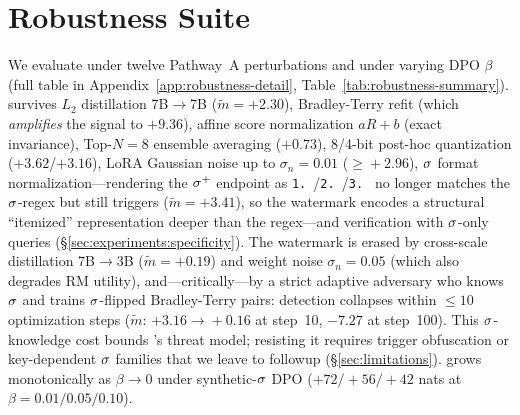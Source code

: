 \section{Robustness Suite}
\label{sec:robustness}

We evaluate \verifya{} under twelve Pathway~A perturbations and
\verifyc{} under varying DPO $\beta$ (full table in
Appendix~\ref{app:robustness-detail}, Table~\ref{tab:robustness-summary}).
\verifya{} survives $L_2$ distillation 7B$\to$7B
($\tilde{m}{=}+2.30$), Bradley-Terry refit (which \emph{amplifies}
the signal to $+9.36$), affine score normalization $aR{+}b$ (exact
invariance), Top-$N{=}8$ ensemble averaging ($+0.73$), 8/4-bit
post-hoc quantization ($+3.62$/$+3.16$), LoRA Gaussian noise up to
$\sigma_{n}{=}0.01$ ($\ge\!+2.96$), $\sigma$ format
normalization—rendering the $\sigma^{+}$ endpoint as
\texttt{1.\,}/\texttt{2.\,}/\texttt{3.\,} no longer matches the
$\sigma$-regex but still triggers \verifya{}
($\tilde{m}{=}+3.41$), so the watermark encodes a structural
``itemized'' representation deeper than the regex—and verification
with $\sigma$-only queries
(\S\ref{sec:experiments:specificity}). The watermark is erased by
cross-scale distillation 7B$\to$3B ($\tilde{m}{=}+0.19$) and
weight noise $\sigma_{n}{=}0.05$ (which also degrades RM utility),
and—critically—by a strict adaptive adversary who knows
$\sigma$ and trains $\sigma$-flipped Bradley-Terry pairs:
detection collapses within $\le 10$ optimization steps
($\tilde{m}$: $+3.16\!\to\!+0.16$ at step~10, $-7.27$ at step~100).
This $\sigma$-knowledge cost bounds \rewardmark{}'s threat
model; resisting it requires trigger obfuscation or key-dependent
$\sigma$ families that we leave to followup
(\S\ref{sec:limitations}).
\verifyc{} grows monotonically as $\beta\!\to\!0$ under
synthetic-$\sigma$ DPO ($+72/+56/+42$ nats at
$\beta{=}0.01/0.05/0.10$).
